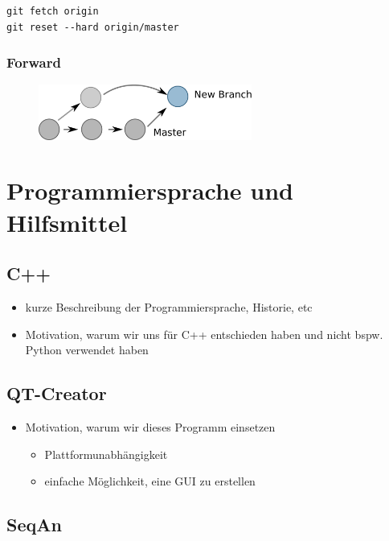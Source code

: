 \begin{verbatim}
git fetch origin
git reset --hard origin/master
\end{verbatim}

\subsubsection{Forward}

\begin{figure}[htb]
\begin{center}
\includegraphics[width=7cm]{bilder/merge.pdf}
\end{center} 
\end{figure}

\section{Programmiersprache und Hilfsmittel}

\subsection{C++}
\begin{itemize}
	\item kurze Beschreibung der Programmiersprache, Historie, etc
	\item Motivation, warum wir uns für C++ entschieden haben und nicht bspw. Python verwendet haben
\end{itemize}

\subsection{QT-Creator}
\begin{itemize}
	\item Motivation, warum wir dieses Programm einsetzen
	\begin{itemize}
		\item Plattformunabhängigkeit
		\item einfache Möglichkeit, eine GUI zu erstellen
	\end{itemize}
\end{itemize}

\subsection{SeqAn}

